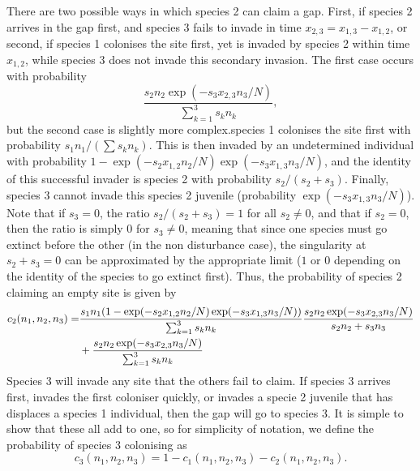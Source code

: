 \documentclass[preprint,10pt,reqno]{amsart}
\begin{document}
There are two possible ways in which species 2 can claim a gap. First, if species 2 arrives in the gap first, and species 3 fails to invade in time $x_{2,3}=x_{1,3}-x_{1,2}$, or second, if species 1 colonises the site first, yet is invaded by species 2 within time $x_{1,2}$, while species 3 does not invade this secondary invasion. The first case occurs with probability
$$
\frac{s_2 n_2\exp(-s_3x_{2,3}n_3/N)}{\sum_{k=1}^3 s_k n_k},
$$
but the second case is slightly more complex.species 1 colonises the site first with probability $s_1n_1/(\sum s_kn_k)$. This is then invaded by an undetermined individual with probability $1-\exp(-s_2x_{1,2}n_2/N)\exp(-s_3x_{1,3}n_3/N)$, and the identity of this successful invader is species 2 with probability $s_2/(s_2+s_3)$. Finally, species 3 cannot invade this species 2 juvenile (probability $\exp(-s_3x_{1,3}n_3/N)$). Note that if $s_3=0$, the ratio $s_2/(s_2+s_3)=1$ for all $s_2 \neq 0$, and that if $s_2=0$, then the ratio is simply $0$ for $s_3 \neq0$, meaning that since one species must go extinct before the other (in the non disturbance case), the singularity at $s_2+s_3=0$ can be approximated by the appropriate limit ($1$ or $0$ depending on the identity of the species to go extinct first). Thus, the probability of species 2 claiming an empty site is given by
\begin{align}
\label{c2}
c_2(n_1,n_2,n_3)=&\frac{s_1 n_1(1-\exp(-s_2x_{1,2}n_2/N)\exp(-s_3x_{1,3}n_3/N))}{\sum_{k=1}^3 s_k n_k}\frac{s_2 n_2\exp(-s_3x_{2,3}n_3/N)}{s_2n_2+s_3n_3} \notag \\
&+\frac{s_2 n_2\exp(-s_3x_{2,3}n_3/N)}{\sum_{k=1}^3 s_k n_k}
\end{align}
Species 3 will invade any site that the others fail to claim. If species 3 arrives first, invades the first coloniser quickly, or invades a specie 2 juvenile that has displaces a species 1 individual, then the gap will go to species 3. It is simple to show that these all add to one, so for simplicity of notation, we define the probability of species 3 colonising as
\begin{equation}
\label{c3}
c_3(n_1,n_2,n_3)=1-c_1(n_1,n_2,n_3)-c_2(n_1,n_2,n_3).\end{equation}
\end{document}
